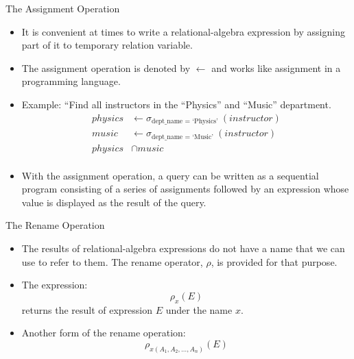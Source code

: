 \documentclass{beamer}
\begin{document}
\begin{frame}{The Assignment Operation}
    \begin{itemize}
        \item It is convenient at times to write a relational-algebra expression by assigning part of it to temporary relation variable.
        \item The assignment operation is denoted by $\leftarrow$ and works like assignment in a programming language.
        \item Example: ``Find all instructors in the ``Physics'' and ``Music'' department.
        \begin{align*}
            physics &\leftarrow \sigma_{\text{dept\_name } = \text{ `Physics' }} (instructor) \\
            music &\leftarrow \sigma_{\text{dept\_name } = \text{ `Music' }} (instructor) \\
            physics &\cap music \\
        \end{align*}
        \item With the assignment operation, a query can be written as a sequential program consisting of a series of assignments followed by an expression whose value is displayed as the result of the query.
    \end{itemize}
\end{frame}

\begin{frame}{The Rename Operation}
    \begin{itemize}
        \item The results of relational-algebra expressions do not have a name that we can use to refer to them. The rename operator, $\rho$, is provided for that purpose.
        \item The expression:
            $$
                {\rho_x(E) }
            $$
            returns the result of expression $E$ under the name $x$.
        \item Another form of the rename operation:
            $$
                {\rho_{x(A_1, A_2, \ldots, A_n)}(E) }
            $$
    \end{itemize}
\end{frame}
\end{document}
